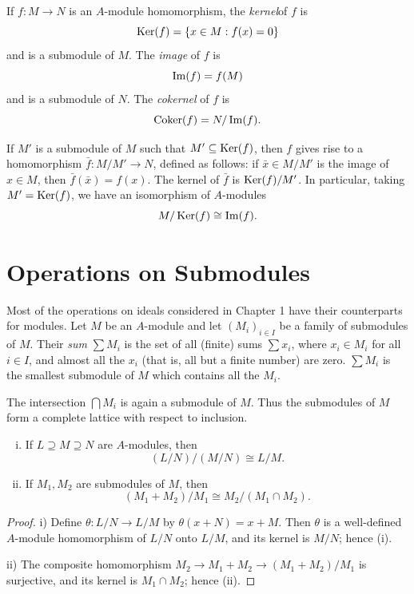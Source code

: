 If $f \colon M \to N$ is an $A$-module homomorphism, the \emph{kernel}of $f$ is
\[
    \operatorname{Ker}(f) = \{x \in M : f(x) = 0\}
\]
and is a submodule of $M$. The \emph{image} of $f$ is
\[
    \operatorname{Im}(f) = f(M)
\]
and is a submodule of $N$. The \emph{cokernel} of $f$ is
\[
    \operatorname{Coker}(f) = N/\operatorname{Im}(f).
\]

If $M'$ is a submodule of $M$ such that $M' \subseteq \operatorname{Ker}(f)$, then $f$ gives rise to a homomorphism $\bar{f} \colon M/M' \to N$, defined as follows: if $\bar{x} \in M/M'$ is the image of $x \in M$, then $\bar{f}(\bar{x}) = f(x)$. The kernel of $\bar{f}$ is $\operatorname{Ker}(f)/M'$. In particular, taking $M' = \operatorname{Ker}(f)$, we have an isomorphism of $A$-modules
\[
    M/\operatorname{Ker}(f) \cong \operatorname{Im}(f).
\]

\section*{Operations on Submodules}

Most of the operations on ideals considered in Chapter 1 have their counterparts for modules. Let $M$ be an $A$-module and let $(M_i)_{i \in I}$ be a family of submodules of $M$. Their \emph{sum} $\sum M_i$ is the set of all (finite) sums $\sum x_i$, where $x_i \in M_i$ for all $i \in I$, and almost all the $x_i$ (that is, all but a finite number) are zero. $\sum M_i$ is the smallest submodule of $M$ which contains all the $M_i$.

The intersection $\bigcap M_i$ is again a submodule of $M$. Thus the submodules of $M$ form a complete lattice with respect to inclusion.

\begin{proposition}\label{prop:submodule-isomorphisms}
\begin{enumerate}[i)]
    \item If $L \supseteq M \supseteq N$ are $A$-modules, then
    \[
        (L/N)/(M/N) \cong L/M.
    \]
    \item If $M_1, M_2$ are submodules of $M$, then
    \[
        (M_1 + M_2)/M_1 \cong M_2/(M_1 \cap M_2).
    \]
\end{enumerate}
\end{proposition}

\begin{proof}
i) Define $\theta \colon L/N \to L/M$ by $\theta(x + N) = x + M$. Then $\theta$ is a well-defined $A$-module homomorphism of $L/N$ onto $L/M$, and its kernel is $M/N$; hence (i).

ii) The composite homomorphism $M_2 \to M_1 + M_2 \to (M_1 + M_2)/M_1$ is surjective, and its kernel is $M_1 \cap M_2$; hence (ii).
\end{proof}

